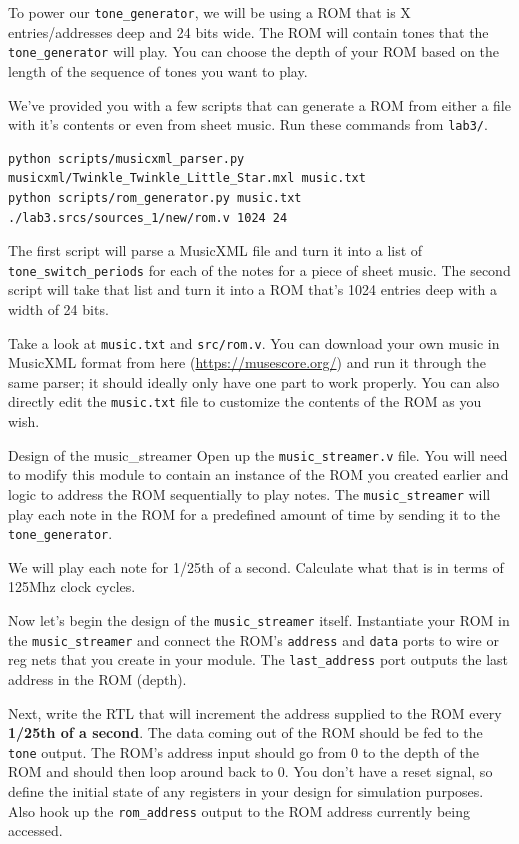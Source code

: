 \documentclass[11pt]{article}
\makeatletter
\renewcommand{\section}
{\@startsection {section}{1}{0pt}
 {-2ex}
 {1ex}
 {\bfseries\Large}}
\makeatother
\begin{document}
To power our \verb|tone_generator|, we will be using a ROM that is X entries/addresses deep and 24 bits wide. The ROM will contain tones that the \verb|tone_generator| will play. You can choose the depth of your ROM based on the length of the sequence of tones you want to play.

We've provided you with a few scripts that can generate a ROM from either a file with it's contents or even from sheet music. Run these commands from \verb|lab3/|.

\begin{verbatim}
python scripts/musicxml_parser.py musicxml/Twinkle_Twinkle_Little_Star.mxl music.txt
python scripts/rom_generator.py music.txt ./lab3.srcs/sources_1/new/rom.v 1024 24
\end{verbatim}

The first script will parse a MusicXML file and turn it into a list of \verb|tone_switch_periods| for each of the notes for a piece of sheet music. The second script will take that list and turn it into a ROM that's 1024 entries deep with a width of 24 bits.

Take a look at \verb|music.txt| and \verb|src/rom.v|. You can download your own music in MusicXML format from here (\url{https://musescore.org/}) and run it through the same parser; it should ideally only have one part to work properly. You can also directly edit the \verb|music.txt| file to customize the contents of the ROM as you wish.

\section{Design of the music\_streamer}
Open up the \verb|music_streamer.v| file. You will need to modify this module to contain an instance of the ROM you created earlier and logic to address the ROM sequentially to play notes. The \verb|music_streamer| will play each note in the ROM for a predefined amount of time by sending it to the \verb|tone_generator|.

We will play each note for 1/25th of a second. Calculate what that is in terms of 125Mhz clock cycles.

Now let's begin the design of the \verb|music_streamer| itself. Instantiate your ROM in the \verb|music_streamer| and connect the ROM's \verb|address| and \verb|data| ports to wire or reg nets that you create in your module.  The \verb|last_address| port outputs the last address in the ROM (depth).

Next, write the RTL that will increment the address supplied to the ROM every \textbf{1/25th of a second}. The data coming out of the ROM should be fed to the \verb|tone| output. The ROM's address input should go from 0 to the depth of the ROM and should then loop around back to 0. You don't have a reset signal, so define the initial state of any registers in your design for simulation purposes. Also hook up the \verb|rom_address| output to the ROM address currently being accessed.
\end{document}
